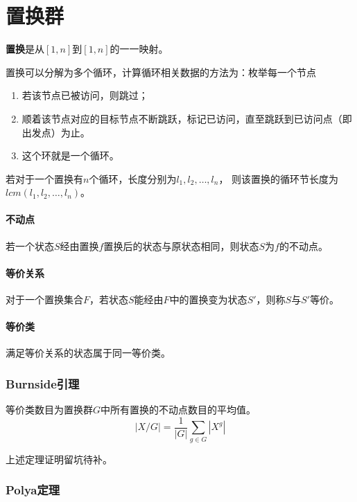 \section{置换群}
{\bfseries 置换}是从$[1,n]$到$[1,n]$的一一映射。

置换可以分解为多个循环，计算循环相关数据的方法为：枚举每一个节点
\begin{enumerate}
    \item 若该节点已被访问，则跳过；
    \item 顺着该节点对应的目标节点不断跳跃，标记已访问，直至跳跃到已访问点（即出发点）为止。
    \item 这个环就是一个循环。
\end{enumerate}
\begin{theorem}
    若对于一个置换有$n$个循环，长度分别为$l_1,l_2,\ldots,l_n$，
    则该置换的循环节长度为$lcm(l_1,l_2,\ldots,l_n)$。
\end{theorem}
\paragraph{不动点}
若一个状态$S$经由置换$f$置换后的状态与原状态相同，则状态$S$为$f$的不动点。
\paragraph{等价关系}
对于一个置换集合$F$，若状态$S$能经由$F$中的置换变为状态$S'$，则称$S$与$S'$等价。
\paragraph{等价类}
满足等价关系的状态属于同一等价类。

\subsubsection{Burnside引理}
\begin{lemma}
    等价类数目为置换群$G$中所有置换的不动点数目的平均值。
    \begin{displaymath}
        |X/G|=\frac{1}{|G|}\sum_{g\in G}|X^g|
    \end{displaymath}
\end{lemma}
上述定理证明留坑待补。
\subsubsection{Polya定理}

